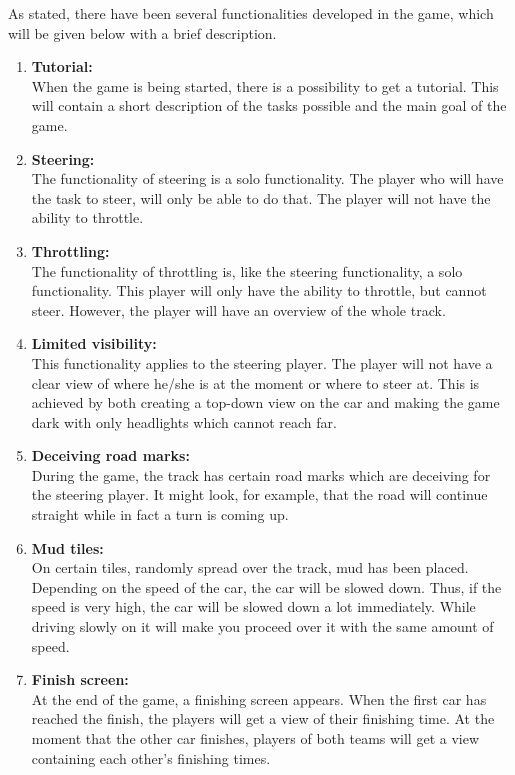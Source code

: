 \documentclass[11pt,twoside,a4paper]{article}
\begin{document}
As stated, there have been several functionalities developed in the game, which will be given below with a brief description. \\

\begin{enumerate}
\item \textbf{Tutorial:} \\
When the game is being started, there is a possibility to get a tutorial. This will contain a short description of the tasks possible and the main goal of the game.
\item \textbf{Steering:} \\
The functionality of steering is a solo functionality. The player who will have the task to steer, will only be able to do that. The player will not have the ability to throttle.
\item \textbf{Throttling:} \\
The functionality of throttling is, like the steering functionality, a solo functionality. This player will only have the ability to throttle, but cannot steer. However, the player will have an overview of the whole track.
\item \textbf{Limited visibility:} \\
This functionality applies to the steering player. The player will not have a clear view of where he/she is at the moment or where to steer at. This is achieved by both creating a top-down view on the car and making the game dark with only headlights which cannot reach far.
\item \textbf{Deceiving road marks:} \\
During the game, the track has certain road marks which are deceiving for the steering player. It might look, for example, that the road will continue straight while in fact a turn is coming up.
\item \textbf{Mud tiles:} \\
On certain tiles, randomly spread over the track, mud has been placed. Depending on the speed of the car, the car will be slowed down. Thus, if the speed is very high, the car will be slowed down a lot immediately. While driving slowly on it will make you proceed over it with the same amount of speed.
\item \textbf{Finish screen:} \\
At the end of the game, a finishing screen appears. When the first car has reached the finish, the players will get a view of their finishing time. At the moment that the other car finishes, players of both teams will get a view containing each other’s finishing times.
\end{enumerate}
\end{document}

